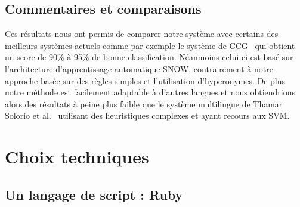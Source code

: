 \documentclass[10pt,a4paper]{article}
\begin{document}
\subsection{Commentaires et comparaisons}
\par Ces résultats nous ont permis de comparer notre système avec certains des meilleurs systèmes actuels
 comme par exemple le système de CCG~\cite{learning:paper} qui obtient un score de 90\% à 95\% de bonne classification. Néanmoins celui-ci est basé sur l'architecture d'apprentissage automatique SNOW, contrairement à notre approche basée sur des règles simples et l'utilisation d'hyperonymes.
De plus notre méthode est facilement adaptable à d'autres langues 
 et nous obtiendrions alors des résultats à peine plus faible que le système multilingue de Thamar Solorio et al.~\cite{solorio:paper} utilisant des heuristiques complexes et ayant recours aux SVM.

\section{Choix techniques}
\subsection{Un langage de script : Ruby}
\end{document}
